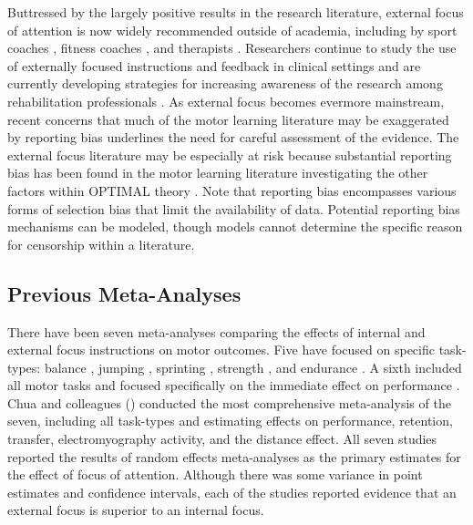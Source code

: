 \documentclass[man,floatsintext,letterpaper,12pt]{apa7}
\begin{document}

Buttressed by the largely positive results in the research literature, external focus of attention is now widely recommended outside of academia, including by sport coaches \autocites[skating:][]{smale2021}[golf:][]{neumann2017}[tennis:][]{kuzdub2022}[baseball:][]{peterson2019}, fitness coaches \autocite{winkelman2015,kompf2015}, and therapists \autocite{magne2017,lo2019}. Researchers continue to study the use of externally focused instructions and feedback in clinical settings \autocite{johnson2023} and are currently developing strategies for increasing awareness of the research among rehabilitation professionals \autocite{hussien2023a,hussien2023b,hussien2023}. As external focus becomes evermore mainstream, recent concerns that much of the motor learning literature may be exaggerated by reporting bias \autocite[e.g.,][]{lohse2016,mckay2022b,mckay2022a,twomey2021b,mesquida2022} underlines the need for careful assessment of the evidence. The external focus literature may be especially at risk because substantial reporting bias has been found in the motor learning literature investigating the other factors within OPTIMAL theory \autocite{mckay2022b,bacelar2022b,mckay2023}. Note that reporting bias encompasses various forms of selection bias that limit the availability of data. Potential reporting bias mechanisms can be modeled, though models cannot determine the specific reason for censorship within a literature.

\subsection{Previous Meta-Analyses}

There have been seven meta-analyses comparing the effects of internal and external focus instructions on motor outcomes. Five have focused on specific task-types: balance \autocite{kim2017}, jumping \autocite{makaruk2020}, sprinting \autocite{li2022}, strength \autocite{grgic2021}, and endurance \autocite{grgic2022}. A sixth included all motor tasks and focused specifically on the immediate effect on performance \autocite{nicklas2022}. Chua and colleagues (\citeyear{chua2021}) conducted the most comprehensive meta-analysis of the seven, including all task-types and estimating effects on performance, retention, transfer, electromyography activity, and the distance effect. All seven studies reported the results of random effects meta-analyses as the primary estimates for the effect of focus of attention. Although there was some variance in point estimates and confidence intervals, each of the studies reported evidence that an external focus is superior to an internal focus.
\end{document}
